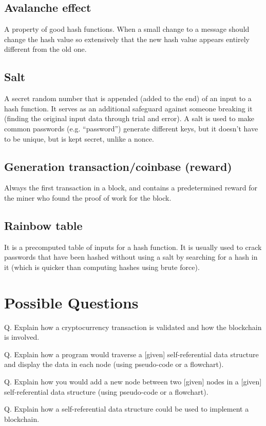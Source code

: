 \documentclass{article}
\begin{document}
\subsection{Avalanche effect}
A property of good hash functions. When a small change to a message should
change the hash value so extensively that the new hash value appears entirely
different from the old one.

\subsection{Salt}
A secret random number that is appended (added to the end) of an input to a
hash function. It serves as an additional safeguard against someone breaking
it (finding the original input data through trial and error). A salt is used
to make common passwords (e.g. “password”) generate different keys, but it
doesn't have to be unique, but is kept secret, unlike a nonce.

\subsection{Generation transaction/coinbase (reward)}
Always the first transaction in a block, and contains a predetermined reward
for the miner who found the proof of work for the block.

\subsection{Rainbow table}
It is a precomputed table of inputs for a hash function. It is usually used to
crack passwords that have been hashed without using a salt by searching for a
hash in it (which is quicker than computing hashes using brute force).


\section{Possible Questions}
Q. Explain how a cryptocurrency transaction is validated and how the blockchain
is involved.

Q. Explain how a program would traverse a [given] self-referential data
structure and display the data in each node (using pseudo-code or a flowchart).

Q. Explain how you would add a new node between two [given] nodes in a [given]
self-referential data structure (using pseudo-code or a flowchart).

Q. Explain how a self-referential data structure could be used to implement a
blockchain.
\end{document}
